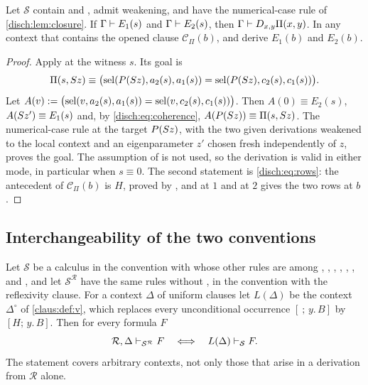 \begin{lemma}
\label{disch:lem:packet}
Let $\mathcal S$ contain  and , admit
weakening, and have the numerical-case rule of \cref{disch:lem:closure}. If
$\Gamma\vdash E_1(s)$ and $\Gamma\vdash E_2(s)$, then
$\Gamma\vdash D_{x,y}\Pi(x,y)$. In any context that contains the opened
clause $\mathcal C_\Pi(b)$,  and  derive
$E_1(b)$ and $E_2(b)$.
\end{lemma}

\begin{proof}
Apply  at the witness $s$. Its goal is
\[
 \Pi(s,S z)\equiv
 \bigl(\operatorname{sel}(P(S z),a_2(s),a_1(s))=\operatorname{sel}(P(S z),c_2(s),c_1(s))\bigr).
\]
Let $A(v)\mathrel{:=}\bigl(\operatorname{sel}(v,a_2(s),a_1(s))=\operatorname{sel}(v,c_2(s),c_1(s))\bigr)$.
Then $A(0)\equiv E_2(s)$, $A(S z')\equiv E_1(s)$ and, by
\eqref{disch:eq:coherence}, $A(P(S z))\equiv\Pi(s,S z)$. The
numerical-case rule at the target $P(S z)$, with the two given
derivations weakened to the local context and an eigenparameter $z'$
chosen fresh independently of $z$, proves the goal. The assumption of
 is not used, so the derivation is valid in either mode, in
particular when $s\equiv 0$. The second statement is \eqref{disch:eq:rows}:
the antecedent of $\mathcal C_\Pi(b)$ is $H$, proved by ,
and  at $1$ and at $2$ gives the two rows at $b$.
\end{proof}

\subsection{Interchangeability of the two conventions}

\begin{lemma}
\label{disch:lem:conventions}
Let $\mathcal S$ be a calculus in the convention with 
whose other rules are among , ,
, , , ,
 and , and let $\mathcal S^{\mathcal R}$
have the same rules without , in the convention with the
reflexivity clause. For a context $\Delta$ of uniform clauses let
$L(\Delta)$ be the context $\Delta^{\circ}$ of \cref{claus:def:v}, which
replaces every unconditional occurrence $[\ ;\,y.\,B]$ by $[H;\,y.\,B]$.
Then for every formula $F$
\[
 \mathcal R,\Delta\vdash_{\mathcal S^{\mathcal R}}F
 \quad\Longleftrightarrow\quad
 L(\Delta)\vdash_{\mathcal S}F .
\]
The statement covers arbitrary contexts, not only those that arise in a
derivation from $\mathcal R$ alone.
\end{lemma}

